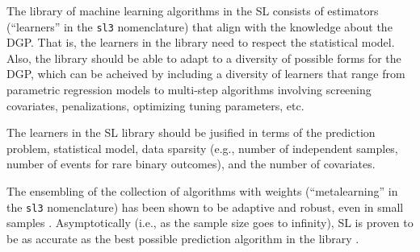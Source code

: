 \documentclass[12pt, krantz2,]{krantz}
\newcommand{\passthrough}[1]{#1}
\theoremstyle{definition}
\theoremstyle{definition}
\theoremstyle{definition}
\newcommand{\1}{\mathbbm{1}}
\begin{document}
The library of machine learning algorithms in the SL consists of estimators
(``learners'' in the \passthrough{\lstinline!sl3!} nomenclature) that align with the knowledge about the
DGP. That is, the learners in the library need to respect the statistical model.
Also, the library should be able to adapt to a diversity of possible forms for
the DGP, which can be acheived by including a diversity of learners that range
from parametric regression models to multi-step algorithms involving screening
covariates, penalizations, optimizing tuning parameters, etc.

\begin{VT1}
The learners in the SL library should be jusified in terms of the prediction 
problem, statistical model, data sparsity (e.g., number of independent samples, 
number of events for rare binary outcomes), and the number of covariates. 
\end{VT1}

The ensembling of the collection of algorithms with weights (``metalearning'' in
the \passthrough{\lstinline!sl3!} nomenclature) has been shown to be adaptive and robust, even in small
samples \citep{polley2010super}. Asymptotically (i.e., as the sample size goes to
infinity), SL is proven to be as accurate as the best possible prediction
algorithm in the library \citep{vdl2003unified, vaart2006oracle}.
\end{document}
